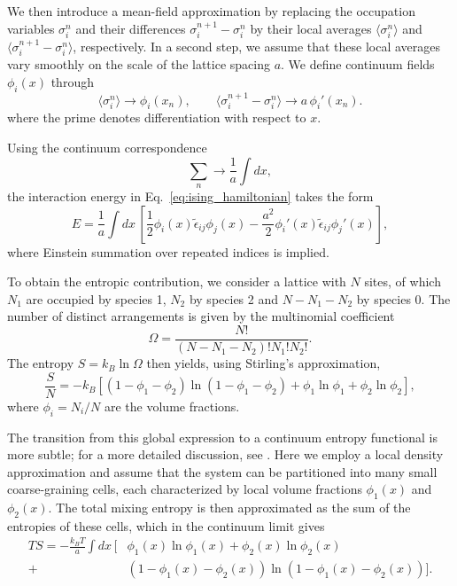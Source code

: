 \documentclass[12pt]{article}
\begin{document}
We then introduce a mean-field approximation by replacing the occupation variables \(\sigma_i^n\) and their differences \(\sigma_i^{n+1} - \sigma_i^n\) by their local averages \(\langle \sigma_i^n \rangle\) and \(\langle \sigma_i^{n+1} - \sigma_i^n \rangle\), respectively.
In a second step, we assume that these local averages vary smoothly on the scale of the lattice spacing \(a\).
We define continuum fields \(\phi_i(x)\) through
\[
\langle \sigma_i^n \rangle \rightarrow \phi_i(x_n),
\qquad
\langle \sigma_i^{n+1} - \sigma_i^n \rangle \rightarrow a\,\phi_i'(x_n).
\]
where the prime denotes differentiation with respect to \(x\).

Using the continuum correspondence
\[
\sum_n \rightarrow \frac{1}{a}\int dx,
\]
the interaction energy in Eq.~\eqref{eq:ising_hamiltonian} takes the form
\[
E
=
\frac{1}{a}\int dx\,
\left[
\frac{1}{2}\phi_i(x)\tilde{\epsilon}_{ij}\phi_j(x)
-
\frac{a^2}{2}\phi_i'(x)\tilde{\epsilon}_{ij}\phi_j'(x)
\right],
\]
where Einstein summation over repeated indices is implied.

To obtain the entropic contribution, we consider a lattice with \(N\) sites, of which \(N_1\) are occupied by species 1, \(N_2\) by species 2 and \(N-N_1-N_2\) by species 0. The number of distinct arrangements is given by the multinomial coefficient
\[
\Omega = \frac{N!}{(N-N_1-N_2)!N_1!N_2!}.
\]
The entropy \(S = k_B \ln \Omega\) then yields, using Stirling's approximation,
\[
\frac{S}{N}
=
-k_B\left[
(1-\phi_1-\phi_2)\ln(1-\phi_1-\phi_2)
+\phi_1\ln\phi_1
+\phi_2\ln\phi_2
\right],
\]
where \(\phi_i = N_i/N\) are the volume fractions.

The transition from this global expression to a continuum entropy functional is more subtle; for a more detailed discussion, see \cite{Blom2024}. Here we employ a local density approximation and assume that the system can be partitioned into many small coarse-graining cells, each characterized by local volume fractions \(\phi_1(x)\) and \(\phi_2(x)\). The total mixing entropy is then approximated as the sum of the entropies of these cells, which in the continuum limit gives
\[
\begin{aligned}
TS
=
-\frac{k_B T}{a}\int dx\,
\Big[&
\phi_1(x)\ln\phi_1(x)
+\phi_2(x)\ln\phi_2(x)\\
+&(1-\phi_1(x)-\phi_2(x))\ln(1-\phi_1(x)-\phi_2(x))
\Big].\\
\end{aligned}
\]
\end{document}
